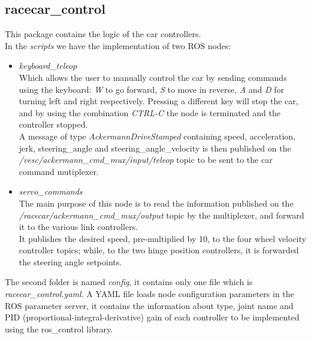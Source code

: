 \subsection{racecar\_control}
This package contains the logic of the car controllers.\\
In the \textit{scripts} we have the implementation of two ROS nodes:
\begin{itemize}
    \item \textit{keyboard\_teleop}\\
    Which allows the user to manually control the car by sending commands using the keyboard: \textit{W} to go forward,
    \textit{S} to move in reverse, \textit{A} and \textit{D} for turning left and right respectively. 
    Pressing a different key will stop the car, and by using the combination \textit{CTRL-C} the node is terminated and
    the controller stopped.\\
    A message of type \textit{AckermannDriveStamped} containing speed, acceleration, jerk, steering\_angle 
    and steering\_angle\_velocity is then published on the \textit{/vesc/ackermann\_cmd\_mux/input/teleop} topic to
    be sent to the car command mutiplexer.
    \item \textit{servo\_commands}\\
    The main purpose of this node is to read the information published on the \textit{/racecar/ackermann\_cmd\_mux/output} 
    topic by the multiplexer, and forward it to the various link controllers. \\
    It publishes the desired speed, pre-multiplied by 10, to the four wheel velocity controller topics; while,
    to the two hinge position controllers, it is forwarded the steering angle setpoints.
\end{itemize}
The second folder is named \textit{config}, it contains only one file which is \textit{racecar\_control.yaml}.
 A YAML file loads node configuration parameters in the ROS parameter server, it contains the information 
 about type, joint name and PID (proportional-integral-derivative) gain of each controller to be implemented 
 using the ros\_control library.

